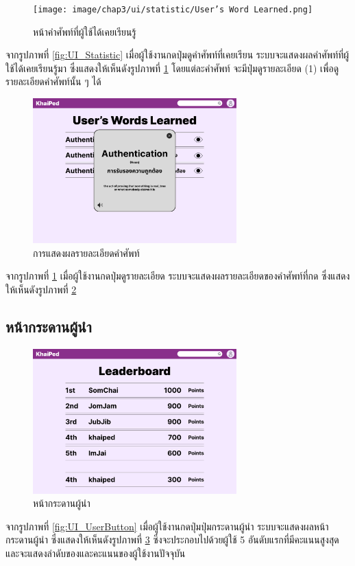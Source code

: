 \documentclass[12pt,oneside,openright,a4paper]{cpe-thai-project}
\begin{document}
\begin{figure}[!h]\centering
	\texttt{[image: image/chap3/ui/statistic/User’s Word Learned.png]}
	\caption{หน้าคำศัพท์ที่ผู้ใช้ได้เคยเรียนรู้}\label{fig:UI_WordLearned}
\end{figure}
\hspace{1cm}
จากรูปภาพที่ \ref{fig:UI_Statistic} เมื่อผู้ใช้งานกดปุ่มดูคำศัพท์ที่เคยเรียน ระบบจะแสดงผลคำศัพท์ที่ผู้ใช้ได้เคยเรียนรู้มา ซึ่งแสดงให้เห็นดังรูปภาพที่ \ref{fig:UI_WordLearned}
โดยแต่ละคำศัพท์ จะมีปุ่มดูรายละเอียด (1) เพื่อดูรายละเอียดคำศัพท์นั้น ๆ ได้

\pagebreak
\begin{figure}[!h]\centering
	\includegraphics[width=0.7\textwidth, keepaspectratio=true]{image/chap3/ui/statistic/Word Learned detail.png}
	\caption{การแสดงผลรายละเอียดคำศัพท์}\label{fig:UI_WordLearnedDetail}
\end{figure}
\hspace{1cm}
จากรูปภาพที่ \ref{fig:UI_WordLearned} เมื่อผู้ใช้งานกดปุ่มดูรายละเอียด ระบบจะแสดงผลรายละเอียดของคำศัพท์ที่กด ซึ่งแสดงให้เห็นดังรูปภาพที่ \ref{fig:UI_WordLearnedDetail}

\pagebreak
\subsection{หน้ากระดานผู้นำ}
\begin{figure}[!h]\centering
	\includegraphics[width=0.7\textwidth, keepaspectratio=true]{image/chap3/ui/statistic/Leaderboard.png}
	\caption{หน้ากระดานผู้นำ}\label{fig:UI_Leaderboard}
\end{figure}
\hspace{1cm}
จากรูปภาพที่ \ref{fig:UI_UserButton} เมื่อผู้ใช้งานกดปุ่มปุ่มกระดานผู้นำ ระบบจะแสดงผลหน้ากระดานผู้นำ ซึ่งแสดงให้เห็นดังรูปภาพที่ \ref{fig:UI_Leaderboard}
ซึ่งจะประกอบไปด้วยผู้ใช้ 5 อันดับแรกที่มีคะแนนสูงสุด และจะแสดงลำดับของและคะแนนของผู้ใช้งานปัจจุบัน
\end{document}
